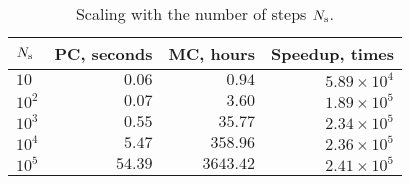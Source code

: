 \begin{table}
  \centering
  \caption{Scaling with the number of steps $N_\text{s}$.}
  \vspace{-10pt}
  \begin{tabular}{lrrr}
    \toprule
    $N_\text{s}$ & PC, seconds & MC, hours & Speedup, times \\
    \midrule
    $   10$ & $ 0.06$ & $   0.94$ & $5.89 \times 10^4$ \\
    $ 10^2$ & $ 0.07$ & $   3.60$ & $1.89 \times 10^5$ \\
    $ 10^3$ & $ 0.55$ & $  35.77$ & $2.34 \times 10^5$ \\
    $ 10^4$ & $ 5.47$ & $ 358.96$ & $2.36 \times 10^5$ \\
    $ 10^5$ & $54.39$ & $3643.42$ & $2.41 \times 10^5$ \\
    \bottomrule
  \end{tabular}
  \vspace{-10pt}
\end{table}
